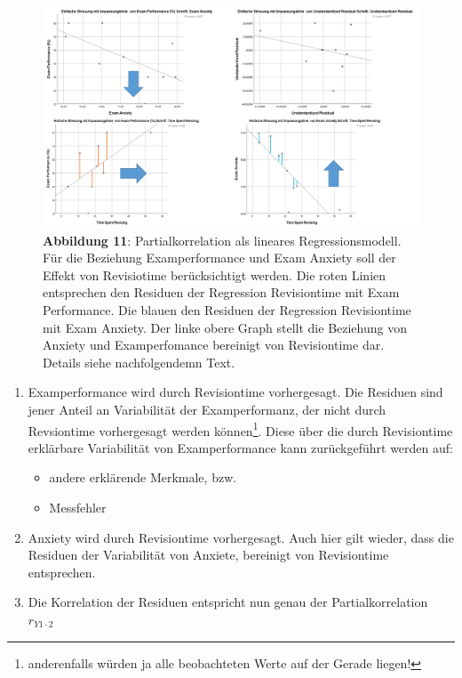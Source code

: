 \documentclass[
]{article}
\providecommand{\tightlist}{%
  \setlength{\itemsep}{0pt}\setlength{\parskip}{0pt}}
\begin{document}
\begin{figure}
\centering
\includegraphics[width=1\textwidth,height=\textheight]{Images/PartialSemipartialLineareRegr.png}
\caption{\textbf{Abbildung 11}: Partialkorrelation als lineares Regressionsmodell. Für die Beziehung Examperformance und Exam Anxiety soll der Effekt von Revisiotime berücksichtigt werden. Die roten Linien entsprechen den Residuen der Regression Revisiontime mit Exam Performance. Die blauen den Residuen der Regression Revisiontime mit Exam Anxiety. Der linke obere Graph stellt die Beziehung von Anxiety und Examperfomance bereinigt von Revisiontime dar. Details siehe nachfolgendemn Text.}
\end{figure}

\begin{enumerate}
\def\labelenumi{\arabic{enumi}.}
\tightlist
\item
  Examperformance wird durch Revisiontime vorhergesagt. Die Residuen sind jener Anteil an Variabilität der Examperformanz, der nicht durch Revsiontime vorhergesagt werden können\footnote{anderenfalls würden ja alle beobachteten Werte auf der Gerade liegen!}. Diese über die durch Revisiontime erklärbare Variabilität von Examperformance kann zurückgeführt werden auf:

  \begin{itemize}
  \tightlist
  \item
    andere erklärende Merkmale, bzw.
  \item
    Messfehler
  \end{itemize}
\item
  Anxiety wird durch Revisiontime vorhergesagt. Auch hier gilt wieder, dass die Residuen der Variabilität von Anxiete, bereinigt von Revisiontime entsprechen.
\item
  Die Korrelation der Residuen entspricht nun genau der Partialkorrelation \(r_{Y1\cdot2}\)
\end{enumerate}
\end{document}
